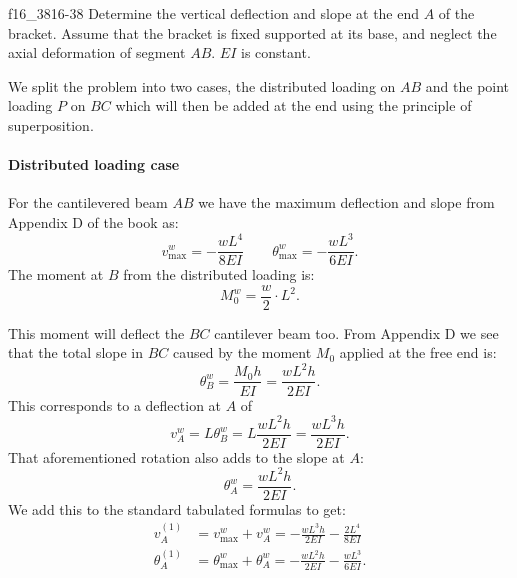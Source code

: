 
\begin{problemwithimage}{f16_38}{16-38}
  Determine the vertical deflection and slope at the end $A$ of the bracket.
  Assume that the bracket is fixed supported at its base, and neglect the axial deformation of segment $AB$.
  $EI$ is constant.
\end{problemwithimage}

\begin{derivation}
  We split the problem into two cases, the distributed loading on $AB$ and the point loading $P$ on $BC$ which will then be added at the end using the principle of superposition.

  \paragraph{Distributed loading case}
  For the cantilevered beam $AB$ we have the maximum deflection and slope from Appendix D of the book as:
  \begin{equation*}
    v_{\mathrm{max}}^{w} = -\frac{wL^{4}}{8EI} \qquad \theta^{w}_{\mathrm{max}} = - \frac{wL^3}{6EI}
  .\end{equation*}
  The moment at $B$ from the distributed loading is:
  \begin{equation*}
    M_0^{w} = \frac{w}{2} \cdot L^2
  .\end{equation*}
  
  This moment will deflect the $BC$ cantilever beam too. From Appendix D we see that the total slope in $BC$ caused by the moment $M_0$ applied at the free end is:
  \begin{equation*}
    \theta_{B}^{w} = \frac{M_0 h}{EI} = \frac{w L^2 h}{2EI}
  .\end{equation*}
  This corresponds to a deflection at $A$ of
  \begin{equation*}
    v_A^{w} = L \theta_B^{w} = L \frac{wL^2 h}{2EI} = \frac{wL^3h}{2EI}
  .\end{equation*}
  That aforementioned rotation also adds to the slope at $A$:
  \begin{equation*}
    \theta_A^{w} = \frac{wL^2 h}{2EI}
  .\end{equation*}
  We add this to the standard tabulated formulas to get:
  \begin{align*}
    v_A^{(1)} &= v_{\mathrm{max}}^{w} + v_A^{w} = - \frac{wL^3h}{2EI} - \frac{2L^{4}}{8EI} \\
    \theta_A^{(1)} &= \theta_{\mathrm{max}}^{w} + \theta_A^{w} = - \frac{wL^2h}{2EI} - \frac{wL^3}{6EI}
  .\end{align*}
  

\end{derivation}
